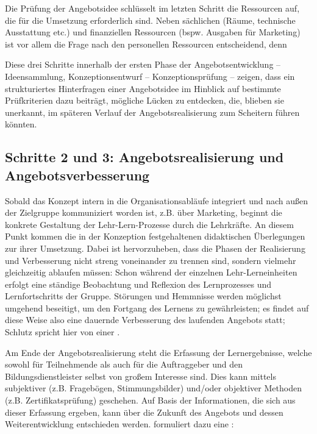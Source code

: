 \documentclass[
  twoside,
  parskip=half-,
  paper=176mm:246mm,
  BCOR=14mm,
  DIV=14,
]{scrreprt}
\begin{document}
Die Prüfung der Angebotsidee schlüsselt im letzten Schritt die Ressourcen auf, die für die Umsetzung erforderlich sind. Neben sächlichen (Räume, technische Ausstattung etc.) und finanziellen Ressourcen (bspw. Ausgaben für Marketing) ist vor allem die Frage nach den personellen Ressourcen entscheidend, denn 

Diese drei Schritte innerhalb der ersten Phase der Angebotsentwicklung -- Ideensammlung, Konzeptionsentwurf -- Konzeptionsprüfung -- zeigen, dass ein strukturiertes Hinterfragen einer Angebotsidee im Hinblick auf bestimmte Prüfkriterien dazu beiträgt, mögliche Lücken zu entdecken, die, blieben sie unerkannt, im späteren Verlauf der Angebotsrealisierung zum Scheitern führen könnten.


\subsection{Schritte 2 und 3: Angebotsrealisierung und Angebotsverbesserung}

Sobald das Konzept intern in die Organisationsabläufe integriert und nach außen der Zielgruppe kommuniziert worden ist, z.B. über Marketing, beginnt die konkrete Gestaltung der Lehr-Lern-Prozesse durch die Lehrkräfte. An diesem Punkt kommen die in der Konzeption festgehaltenen didaktischen Überlegungen zur ihrer Umsetzung. Dabei ist hervorzuheben, dass die Phasen der Realisierung und Verbesserung nicht streng voneinander zu trennen sind, sondern vielmehr gleichzeitig ablaufen müssen: Schon während der einzelnen Lehr-Lerneinheiten erfolgt eine ständige Beobachtung und Reflexion des Lernprozesses und Lernfortschritts der Gruppe. Störungen und Hemmnisse werden möglichst umgehend beseitigt, um den Fortgang des Lernens zu gewährleisten; es findet auf diese Weise also eine dauernde Verbesserung des laufenden Angebots statt; Schlutz spricht hier von einer .

Am Ende der Angebotsrealisierung steht die Erfassung der Lernergebnisse, welche sowohl für Teilnehmende als auch für die Auftraggeber und den Bildungsdienstleister selbst von großem Interesse sind. Dies kann mittels subjektiver (z.B. Fragebögen, Stimmungsbilder) und/oder objektiver Methoden (z.B. Zertifikatsprüfung) geschehen. Auf Basis der Informationen, die sich aus dieser Erfassung ergeben, kann über die Zukunft des Angebots und dessen Weiterentwicklung entschieden werden. \citeauthor{schlutz} formuliert dazu eine : 
\end{document}

